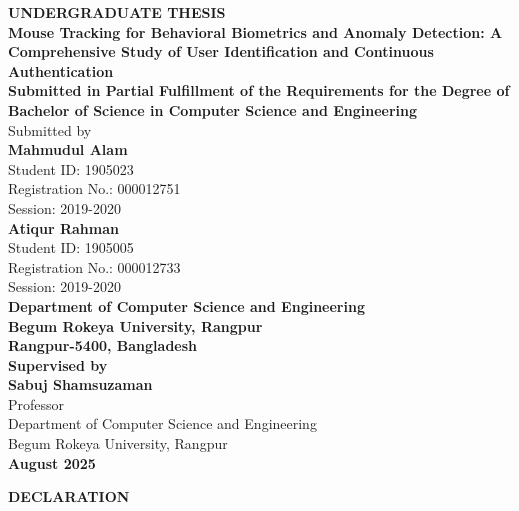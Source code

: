 \documentclass[
  12pt,
  a4paper,
]{report}
\author{}
\date{}
\begin{document}
{
\setcounter{tocdepth}{2}
\tableofcontents
}
\newpage
\thispagestyle{empty}

\begin{center}
\vspace\*{2cm}

\textbf{UNDERGRADUATE THESIS}\\[2cm]

{\LARGE \textbf{Mouse Tracking for Behavioral Biometrics and Anomaly Detection: A Comprehensive Study of User Identification and Continuous Authentication}}\\[2cm]

\textbf{Submitted in Partial Fulfillment of the Requirements for the Degree of}\\[0.5cm]
\textbf{Bachelor of Science in Computer Science and Engineering}\\[2cm]

Submitted by\\[1cm]
\textbf{Mahmudul Alam}\\
Student ID: 1905023\\
Registration No.: 000012751\\
Session: 2019-2020\\[1cm]

\textbf{Atiqur Rahman}\\
Student ID: 1905005\\
Registration No.: 000012733\\
Session: 2019-2020\\[2cm]

\textbf{Department of Computer Science and Engineering}\\
\textbf{Begum Rokeya University, Rangpur}\\
\textbf{Rangpur-5400, Bangladesh}\\[2cm]

\textbf{Supervised by}\\[0.5cm]
\textbf{Sabuj Shamsuzaman}\\
Professor\\
Department of Computer Science and Engineering\\
Begum Rokeya University, Rangpur\\[1.5cm]

\textbf{August 2025}

\vspace\*{\fill}
\end{center}

\newpage

\newpage
\thispagestyle{plain}

\begin{center}
\vspace\*{2cm}
\textbf{\Large DECLARATION}
\end{center}
\end{document}
